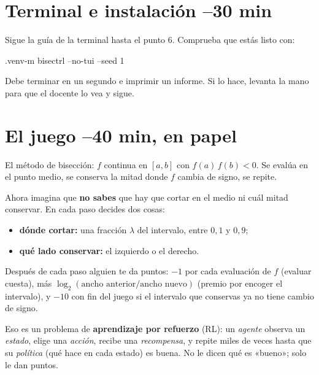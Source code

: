 \section{Terminal e instalación \hfill\small{}–30 min}

Sigue la guía de la terminal hasta el punto 6. Comprueba que estás listo con:
\begin{orden}
.venv\Scripts\python -m bisectrl --no-tui --seed 1
\end{orden}
Debe terminar en un segundo e imprimir un informe. Si lo hace, levanta la mano para que el docente lo vea y sigue.

\section{El juego \hfill\small{}–40 min, en papel}

El método de bisección: $f$ continua en $[a,b]$ con $f(a)\,f(b)<0$. Se evalúa en el punto medio, se conserva la mitad donde $f$ cambia de signo, se repite.

Ahora imagina que \textbf{no sabes} que hay que cortar en el medio ni cuál mitad conservar. En cada paso decides dos cosas:
\begin{itemize}
\item \textbf{dónde cortar:} una fracción $\lambda$ del intervalo, entre $0{,}1$ y $0{,}9$;
\item \textbf{qué lado conservar:} el izquierdo o el derecho.
\end{itemize}
Después de cada paso alguien te da puntos: $-1$ por cada evaluación de $f$ (evaluar cuesta), más $\log_2(\text{ancho anterior}/\text{ancho nuevo})$ (premio por encoger el intervalo), y $-10$ con fin del juego si el intervalo que conservas ya no tiene cambio de signo.

Eso es un problema de \textbf{aprendizaje por refuerzo} (RL): un \emph{agente} observa un \emph{estado}, elige una \emph{acción}, recibe una \emph{recompensa}, y repite miles de veces hasta que su \emph{política} (qué hace en cada estado) es buena. No le dicen qué es «bueno»; solo le dan puntos.

\begin{nota}
\begin{preguntas}
\end{preguntas}
\end{nota}


